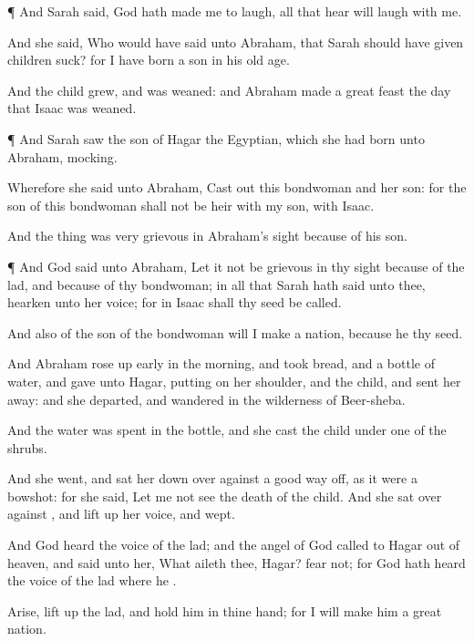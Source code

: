 {\par }{\PP {}¶ And
Sarah
said,
God hath
made me to
laugh,
{} all that
hear will
laugh with me.

And she
said, Who would have
said unto
Abraham, that
Sarah should have given
children
suck? for I have
born
{} a
son in his old
age.

And the
child
grew, and was
weaned: and
Abraham
made a
great
feast the
{}
day that
Isaac was
weaned.


\par }{\PP {}¶ And
Sarah
saw the
son of
Hagar the
Egyptian, which she had
born unto
Abraham,
mocking.

Wherefore she
said unto
Abraham, Cast
out this
bondwoman and her
son: for the
son of this
bondwoman shall not be
heir with my
son,
{} with
Isaac.

And the
thing was
very
grievous in
Abraham’s
sight
because of his
son.


\par }{\PP {}¶ And
God
said unto
Abraham, Let it not be
grievous in thy
sight because of the
lad, and because of thy
bondwoman; in all that
Sarah hath
said unto thee,
hearken unto her
voice; for in
Isaac shall thy
seed be
called.

And also of the
son of the
bondwoman will I
make a
nation, because he
{} thy
seed.


\par }{\PP {}And
Abraham rose up
early in the
morning, and
took
bread, and a
bottle of
water, and
gave
{} unto
Hagar,
putting
{} on her
shoulder, and the
child, and sent her
away: and she
departed, and
wandered in the
wilderness of
Beer-sheba.

And the
water was
spent
in the
bottle, and she
cast the
child under
one of the
shrubs.

And she
went, and sat her
down over
against
{} a good way
off, as it were a
bowshot: for she
said, Let me not
see the
death of the
child. And she
sat over against
{}, and lift
up her
voice, and
wept.

And
God
heard the
voice of the
lad; and the
angel of
God
called to
Hagar out of
heaven, and
said unto her, What aileth thee,
Hagar?
fear not; for
God hath
heard the
voice of the
lad where he
{}.

Arise, lift
up the
lad, and
hold him in thine
hand; for I will
make him a
great
nation.

}
